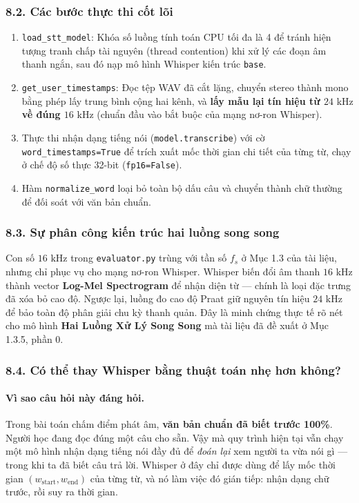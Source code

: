 \documentclass[11pt,a4paper]{article}
\begin{document}
\subsubsection*{8.2. Các bước thực thi cốt lõi}
\begin{enumerate}
    \setlength{\itemsep}{0.5pt}
    \item \texttt{load\_stt\_model}: Khóa số luồng tính toán CPU tối đa là 4 để tránh hiện tượng tranh chấp tài nguyên (thread contention) khi xử lý các đoạn âm thanh ngắn, sau đó nạp mô hình Whisper kiến trúc \texttt{base}.
    \item \texttt{get\_user\_timestamps}: Đọc tệp WAV đã cắt lặng, chuyển stereo thành mono bằng phép lấy trung bình cộng hai kênh, và \textbf{lấy mẫu lại tín hiệu từ $24\text{ kHz}$ về đúng $16\text{ kHz}$} (chuẩn đầu vào bắt buộc của mạng nơ-ron Whisper).
    \item Thực thi nhận dạng tiếng nói (\texttt{model.transcribe}) với cờ \texttt{word\_timestamps=True} để trích xuất mốc thời gian chi tiết của từng từ, chạy ở chế độ số thực 32-bit (\texttt{fp16=False}).
    \item Hàm \texttt{normalize\_word} loại bỏ toàn bộ dấu câu và chuyển thành chữ thường để đối soát với văn bản chuẩn.
\end{enumerate}

\subsubsection*{8.3. Sự phân công kiến trúc hai luồng song song}
Con số $16\text{ kHz}$ trong \texttt{evaluator.py} trùng với tần số $f_s$ ở Mục 1.3 của tài liệu, nhưng chỉ phục vụ cho mạng nơ-ron Whisper. Whisper biến đổi âm thanh $16\text{ kHz}$ thành vector \textbf{Log-Mel Spectrogram} để nhận diện từ --- chính là loại đặc trưng đã xóa bỏ cao độ. Ngược lại, luồng đo cao độ Praat giữ nguyên tín hiệu $24\text{ kHz}$ để bảo toàn độ phân giải chu kỳ thanh quản. Đây là minh chứng thực tế rõ nét cho mô hình \textbf{Hai Luồng Xử Lý Song Song} mà tài liệu đã đề xuất ở Mục 1.3.5, phần 0.


\subsubsection*{8.4. Có thể thay Whisper bằng thuật toán nhẹ hơn không?}

\paragraph{Vì sao câu hỏi này đáng hỏi.}
Trong bài toán chấm điểm phát âm, \textbf{văn bản chuẩn đã biết trước 100\%}. Người học đang đọc đúng một câu cho sẵn. Vậy mà quy trình hiện tại vẫn chạy một mô hình nhận dạng tiếng nói đầy đủ để \emph{đoán lại} xem người ta vừa nói gì --- trong khi ta đã biết câu trả lời. Whisper ở đây chỉ được dùng để lấy mốc thời gian $(w_{\text{start}}, w_{\text{end}})$ của từng từ, và nó làm việc đó gián tiếp: nhận dạng chữ trước, rồi suy ra thời gian.
\end{document}
